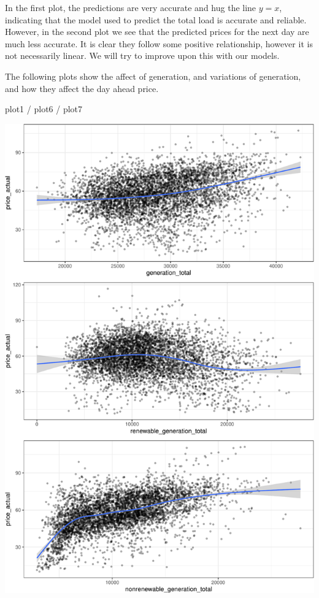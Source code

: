 \documentclass[
]{article}
\newenvironment{Shaded}{\begin{snugshade}}{\end{snugshade}}
\newcommand{\NormalTok}[1]{\textcolor[rgb]{0.00,0.23,0.31}{#1}}
\newcommand{\SpecialCharTok}[1]{\textcolor[rgb]{0.37,0.37,0.37}{#1}}
\begin{document}
In the first plot, the predictions are very accurate and hug the line
\(y = x\), indicating that the model used to predict the total load is
accurate and reliable. However, in the second plot we see that the
predicted prices for the next day are much less accurate. It is clear
they follow some positive relationship, however it is not necessarily
linear. We will try to improve upon this with our models.

The following plots show the affect of generation, and variations of
generation, and how they affect the day ahead price.

\begin{Shaded}
\begin{Highlighting}[]
\NormalTok{plot1 }\SpecialCharTok{/}\NormalTok{ plot6 }\SpecialCharTok{/}\NormalTok{ plot7}
\end{Highlighting}
\end{Shaded}

\includegraphics{Analytics_Report_files/figure-pdf/plot167-1.pdf}
\end{document}
